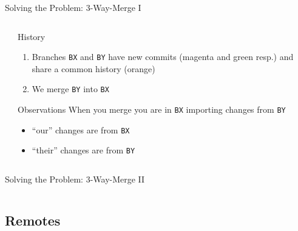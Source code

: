\documentclass[xetex, handout]{beamer}
\begin{document}
\begin{frame}[fragile]{Solving the Problem: 3-Way-Merge I}
\begin{columns}
\begin{column}{.5\linewidth}
    \end{column}
    \begin{column}{.5\linewidth}
      \begin{exampleblock}{History}
        \begin{enumerate}
          \item Branches \texttt{BX} and \texttt{BY} have new commits (magenta
            and green resp.) and share a common history (orange)
          \item We merge \texttt{BY} into \texttt{BX}
        \end{enumerate}
      \end{exampleblock}
      \begin{alertblock}{Observations}
        When you merge you are in \texttt{BX} importing changes from \texttt{BY}
        \begin{itemize}
          \item ``our'' changes are from \texttt{BX}
          \item ``their'' changes are from \texttt{BY}
        \end{itemize}
      \end{alertblock}
    \end{column}
  \end{columns}
\end{frame}

\begin{frame}[fragile]{Solving the Problem: 3-Way-Merge II}
  \begin{columns}
    \begin{column}{.5\linewidth}
    \end{column}
    \begin{column}{.5\linewidth}
    \end{column}
  \end{columns}
\end{frame}

\subsection{Remotes}
\end{document}
